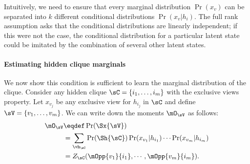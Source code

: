 Intuitively, we need to ensure that every marginal distribution
  $\Pr(x_v)$ can be separated into $k$ different conditional distributions
  $\Pr(x_v | h_i)$. 
The full rank assumption asks that the conditional distributions are
  linearly independent; if this were not the case, the conditional
  distribution for a particular latent state could be imitated by the
  combination of several other latent states.




\paragraph{Estimating hidden clique marginals}

We now show this condition is sufficient to learn the marginal
  distribution of the clique.
Consider any hidden clique $\sC = \{i_1, \ldots, i_m\}$ with the exclusive views property. Let
  $x_{v_j}$ be any exclusive view for $h_{i_j}$ in $\sC$ and define $\sV
  = \{v_1, \ldots, v_m\}$. %
We can write down the moments $\mO_\sV$ as follows:
\begin{align*}
  \mO_\sV 
  &\eqdef \Pr(\Sx{\sV}) \\
      &= \sum_{\vh_\sC} \Pr(\Sh{\sC}) 
          \Pr(x_{v_1} | h_{i_1}) \cdots \Pr(x_{v_m} | h_{i_m}) \\
    &= Z_{\sC}(\mOpp{v_1}{i_1},\cdots,\mOpp{v_m}{i_m}).
\end{align*}

